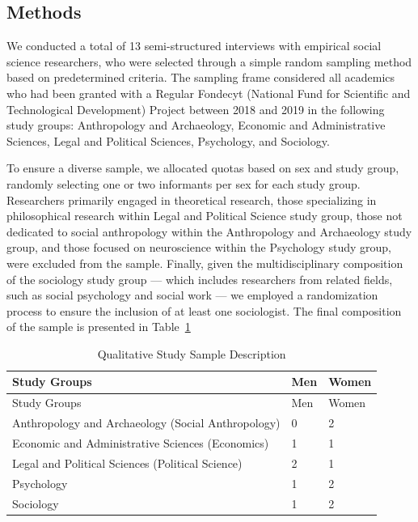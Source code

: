 \documentclass[
  letterpaper,
]{article}
\begin{document}
\subsection{Methods}\label{methods}

We conducted a total of 13 semi-structured interviews with empirical
social science researchers, who were selected through a simple random
sampling method based on predetermined criteria. The sampling frame
considered all academics who had been granted with a Regular Fondecyt
(National Fund for Scientific and Technological Development) Project
between 2018 and 2019 in the following study groups: Anthropology and
Archaeology, Economic and Administrative Sciences, Legal and Political
Sciences, Psychology, and Sociology.

To ensure a diverse sample, we allocated quotas based on sex and study
group, randomly selecting one or two informants per sex for each study
group. Researchers primarily engaged in theoretical research, those
specializing in philosophical research within Legal and Political
Science study group, those not dedicated to social anthropology within
the Anthropology and Archaeology study group, and those focused on
neuroscience within the Psychology study group, were excluded from the
sample. Finally, given the multidisciplinary composition of the
sociology study group --- which includes researchers from related
fields, such as social psychology and social work --- we employed a
randomization process to ensure the inclusion of at least one
sociologist. The final composition of the sample is presented in
Table~\ref{tbl-qual-sample}

\begin{longtable}[]{@{}lll@{}}
\caption{Qualitative Study Sample
Description}\label{tbl-qual-sample}\tabularnewline
\toprule\noalign{}
Study Groups & Men & Women \\
\midrule\noalign{}
\endfirsthead
\toprule\noalign{}
Study Groups & Men & Women \\
\midrule\noalign{}
\endhead
\bottomrule\noalign{}
\endlastfoot
Anthropology and Archaeology (Social Anthropology) & 0 & 2 \\
Economic and Administrative Sciences (Economics) & 1 & 1 \\
Legal and Political Sciences (Political Science) & 2 & 1 \\
Psychology & 1 & 2 \\
Sociology & 1 & 2 \\
\end{longtable}
\end{document}
